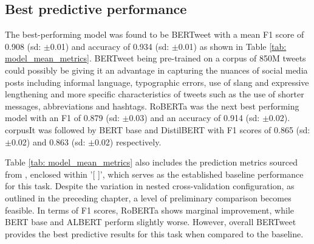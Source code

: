 \subsection{Best predictive performance}
The best-performing model was found to be BERTweet with a mean F1 score of 0.908 (sd: $\pm$0.01) and accuracy of 0.934 (sd: $\pm$0.01) as shown in Table \ref{tab: model_mean_metrics}. BERTweet being pre-trained on a corpus of 850M tweets could possibly be giving it an advantage in capturing the nuances of social media posts including informal language, typographic errors, use of slang and expressive lengthening and more specific characteristics of tweets such as the use of shorter messages, abbreviations and hashtags. RoBERTa was the next best performing model with an F1 of 0.879 (sd: $\pm$0.03) and an accuracy of 0.914 (sd: $\pm$0.02). corpusIt was followed by BERT base and DistilBERT with F1 scores of 0.865 (sd: $\pm$0.02) and 0.863 (sd: $\pm$0.02) respectively. 

Table \ref{tab: model_mean_metrics} also includes the prediction metrics sourced from \cite{jin_complaint_2020}, enclosed within '[ ]', which serves as the established baseline performance for this task. Despite the variation in nested cross-validation configuration, as outlined in the preceding chapter, a level of preliminary comparison becomes feasible. In terms of F1 scores, RoBERTa shows marginal improvement, while BERT base and ALBERT perform slightly worse. However, overall BERTweet provides the best predictive results for this task when compared to the baseline.\\

